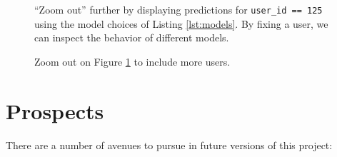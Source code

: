 \documentclass[11pt]{article}
\theoremstyle{definition}
\numberwithin{equation}{section}
\begin{document}
\begin{figure}[]
\begin{center}
\caption[Model Variant Prediction Exploration for a Fixed User]{``Zoom out'' further by displaying predictions for \texttt{user\_id == 125} using the model choices of Listing \ref{lst:models}. By fixing a user, we can inspect the behavior of different models.}
\label{fig:models-styles}
\end{center}
\end{figure}




\begin{figure}[]
\begin{center}
\caption[Prediction Exploration for Varying User and Model]{Zoom out on Figure \ref{fig:models-styles} to include more users.}
\label{fig:users-models-styles}
\end{center}
\end{figure}


  
  \newpage
  
\hypertarget{prospects}{%
  \section{Prospects}\label{prospects}}  

There are a number of avenues to pursue in future versions of this project:
\end{document}
